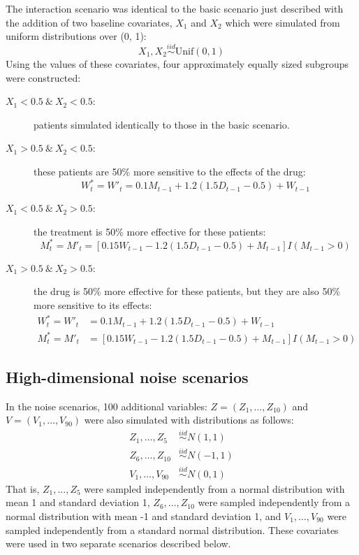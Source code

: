 \documentclass[12pt]{article}
\begin{document}
The interaction scenario was identical to the basic scenario just described with the addition of two baseline covariates, $X_{1}$ and $X_{2}$ which were simulated from uniform distributions over (0, 1):
\begin{equation}
  X_{1}, X_{2} \overset{iid}{\sim} \text{Unif}(0, 1)
\end{equation}
Using the values of these covariates, four approximately equally sized subgroups were constructed:
\begin{description}
  \item [$X_{1} < 0.5 \ \& \ X_{2} < 0.5$:] patients simulated identically to those in the basic scenario.
  \item [$X_{1} > 0.5 \ \& \ X_{2} < 0.5$:] these patients are 50\% more sensitive to the effects of the drug:
   \begin{equation}
   W^{*}_{t} = W'_{t} = 0.1 M_{t-1} + 1.2 (1.5 D_{t-1} - 0.5) + W_{t - 1}
   \end{equation}
   \item [$X_{1} < 0.5 \ \& \ X_{2} > 0.5$:] the treatment is 50\% more effective for these patients:
\begin{equation}
M^{*}_{t} =  M'_{t} = [0.15 W_{t-1} - 1.2 (1.5 D_{t-1} - 0.5) + M_{t - 1}] I(M_{t-1} > 0)
\end{equation}
   \item [$X_{1} > 0.5 \ \& \ X_{2} > 0.5$:] the drug is 50\% more effective for these patients, but they are also 50\% more sensitive to its effects:
   \begin{align}
   W^{*}_{t} = W'_{t} &= 0.1 M_{t-1} + 1.2 (1.5 D_{t-1} - 0.5) + W_{t - 1} \\
   M^{*}_{t} = M'_{t} &= [0.15 W_{t-1} - 1.2 (1.5 D_{t-1} - 0.5) + M_{t - 1}] I(M_{t-1} > 0)
   \end{align}
\end{description}


\subsection{High-dimensional noise scenarios} %
\label{sub:noise_variables}

In the noise scenarios, 100 additional variables: $Z = (Z_{1}, \ldots, Z_{10})$ and $V = (V_{1}, \ldots, V_{90})$ were also simulated with distributions as follows:
\begin{align}
  Z_{1}, \ldots, Z_{5} &\overset{iid}{\sim} N(1, 1) \\
  Z_{6}, \ldots, Z_{10} &\overset{iid}{\sim} N(-1, 1) \\
  V_{1}, \ldots, V_{90} &\overset{iid}{\sim} N(0, 1)
\end{align}
That is, $Z_{1}, \ldots, Z_{5}$ were sampled independently from a normal distribution with mean 1 and standard deviation 1, $Z_{6}, \ldots, Z_{10}$ were sampled independently from a normal distribution with mean -1 and standard deviation 1, and $V_{1}, \ldots, V_{90}$ were sampled independently from a standard normal distribution. These covariates were used in two separate scenarios described below.
\end{document}
